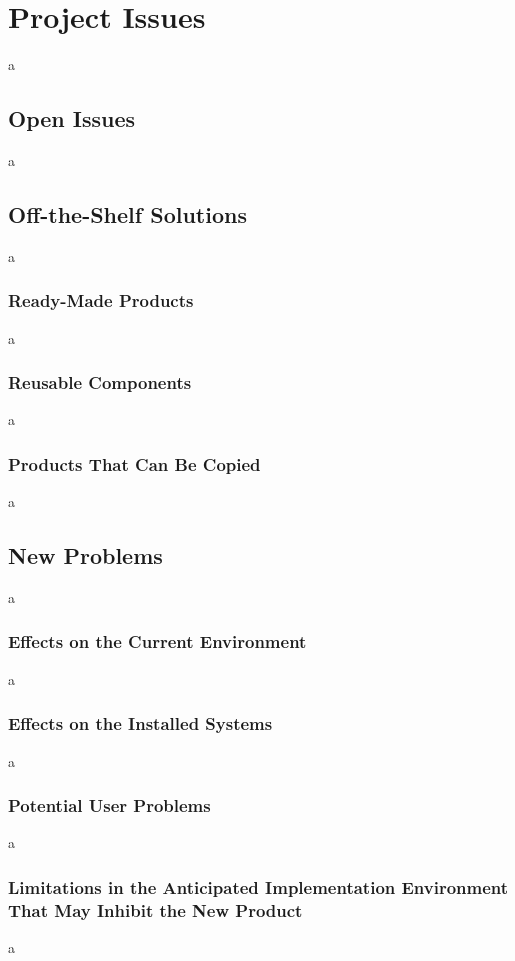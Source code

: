 \documentclass[12pt]{article}
\begin{document}
\section{Project Issues}
a

\subsection{Open Issues}
a

\subsection{Off-the-Shelf Solutions}
a

\subsubsection{Ready-Made Products}
a

\subsubsection{Reusable Components}
a

\subsubsection{Products That Can Be Copied}
a

\subsection{New Problems}
a

\subsubsection{Effects on the Current Environment}
a

\subsubsection{Effects on the Installed Systems }
a

\subsubsection{Potential User Problems}
a

\subsubsection{Limitations in the Anticipated Implementation Environment That May Inhibit the New Product}
a
\end{document}
